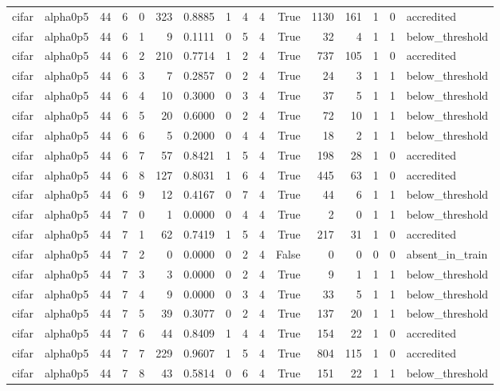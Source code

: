 \begin{tabular}{llrrrrrrrrrrrrrl}
cifar & alpha0p5 & 44 & 6 & 0 & 323 & 0.8885 & 1 & 4 & 4 & True & 1130 & 161 & 1 & 0 & accredited \\
cifar & alpha0p5 & 44 & 6 & 1 & 9 & 0.1111 & 0 & 5 & 4 & True & 32 & 4 & 1 & 1 & below\_threshold \\
cifar & alpha0p5 & 44 & 6 & 2 & 210 & 0.7714 & 1 & 2 & 4 & True & 737 & 105 & 1 & 0 & accredited \\
cifar & alpha0p5 & 44 & 6 & 3 & 7 & 0.2857 & 0 & 2 & 4 & True & 24 & 3 & 1 & 1 & below\_threshold \\
cifar & alpha0p5 & 44 & 6 & 4 & 10 & 0.3000 & 0 & 3 & 4 & True & 37 & 5 & 1 & 1 & below\_threshold \\
cifar & alpha0p5 & 44 & 6 & 5 & 20 & 0.6000 & 0 & 2 & 4 & True & 72 & 10 & 1 & 1 & below\_threshold \\
cifar & alpha0p5 & 44 & 6 & 6 & 5 & 0.2000 & 0 & 4 & 4 & True & 18 & 2 & 1 & 1 & below\_threshold \\
cifar & alpha0p5 & 44 & 6 & 7 & 57 & 0.8421 & 1 & 5 & 4 & True & 198 & 28 & 1 & 0 & accredited \\
cifar & alpha0p5 & 44 & 6 & 8 & 127 & 0.8031 & 1 & 6 & 4 & True & 445 & 63 & 1 & 0 & accredited \\
cifar & alpha0p5 & 44 & 6 & 9 & 12 & 0.4167 & 0 & 7 & 4 & True & 44 & 6 & 1 & 1 & below\_threshold \\
cifar & alpha0p5 & 44 & 7 & 0 & 1 & 0.0000 & 0 & 4 & 4 & True & 2 & 0 & 1 & 1 & below\_threshold \\
cifar & alpha0p5 & 44 & 7 & 1 & 62 & 0.7419 & 1 & 5 & 4 & True & 217 & 31 & 1 & 0 & accredited \\
cifar & alpha0p5 & 44 & 7 & 2 & 0 & 0.0000 & 0 & 2 & 4 & False & 0 & 0 & 0 & 0 & absent\_in\_train \\
cifar & alpha0p5 & 44 & 7 & 3 & 3 & 0.0000 & 0 & 2 & 4 & True & 9 & 1 & 1 & 1 & below\_threshold \\
cifar & alpha0p5 & 44 & 7 & 4 & 9 & 0.0000 & 0 & 3 & 4 & True & 33 & 5 & 1 & 1 & below\_threshold \\
cifar & alpha0p5 & 44 & 7 & 5 & 39 & 0.3077 & 0 & 2 & 4 & True & 137 & 20 & 1 & 1 & below\_threshold \\
cifar & alpha0p5 & 44 & 7 & 6 & 44 & 0.8409 & 1 & 4 & 4 & True & 154 & 22 & 1 & 0 & accredited \\
cifar & alpha0p5 & 44 & 7 & 7 & 229 & 0.9607 & 1 & 5 & 4 & True & 804 & 115 & 1 & 0 & accredited \\
cifar & alpha0p5 & 44 & 7 & 8 & 43 & 0.5814 & 0 & 6 & 4 & True & 151 & 22 & 1 & 1 & below\_threshold \\

\end{tabular}
